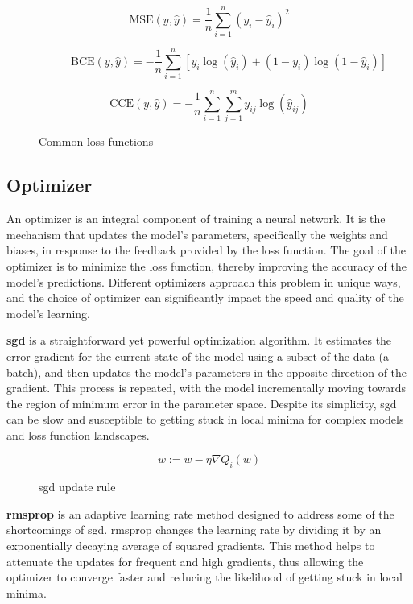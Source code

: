 \begin{figure}[H]
    \begin{subfigure}{\textwidth}
        \[ \text{MSE}(y, \hat{y}) = \frac{1}{n} \sum_{i=1}^{n}(y_i - \hat{y}_i)^2 \]
    \end{subfigure}

    \begin{subfigure}{\textwidth}
        \[ \text{BCE}(y, \hat{y}) = -\frac{1}{n} \sum_{i=1}^{n} [y_i \log(\hat{y}_i) + (1 - y_i) \log(1 - \hat{y}_i)] \]
    \end{subfigure}

    \begin{subfigure}{\textwidth}
        \[ \text{CCE}(y, \hat{y}) = -\frac{1}{n} \sum_{i=1}^{n} \sum_{j=1}^{m} y_{ij} \log(\hat{y}_{ij}) \]
    \end{subfigure}
    \caption{Common loss functions}
\end{figure}

\subsection{Optimizer}

An optimizer is an integral component of training a neural network. It is the
mechanism that updates the model's parameters, specifically the weights and
biases, in response to the feedback provided by the loss function. The goal of
the optimizer is to minimize the loss function, thereby improving the accuracy
of the model's predictions. Different optimizers approach this problem in
unique ways, and the choice of optimizer can significantly impact the speed and
quality of the model's learning.

\textbf{\gls{sgd}} is a straightforward yet powerful optimization
algorithm. It estimates the error gradient for the current state of the model
using a subset of the data (a batch), and then updates the model's parameters
in the opposite direction of the gradient. This process is repeated, with the
model incrementally moving towards the region of minimum error in the parameter
space. Despite its simplicity, \gls{sgd} can be slow and susceptible to getting stuck
in local minima for complex models and loss function landscapes.

\begin{figure}[H]
    \[ w := w - \eta\nabla Q_i(w) \]
    \caption{\gls{sgd} update rule}
\end{figure}

\textbf{\gls{rmsprop}} is an adaptive learning rate method
designed to address some of the shortcomings of \gls{sgd}. \gls{rmsprop} changes the
learning rate by dividing it by an exponentially decaying average of squared
gradients. This method helps to attenuate the updates for frequent and high
gradients, thus allowing the optimizer to converge faster and reducing the
likelihood of getting stuck in local minima.

